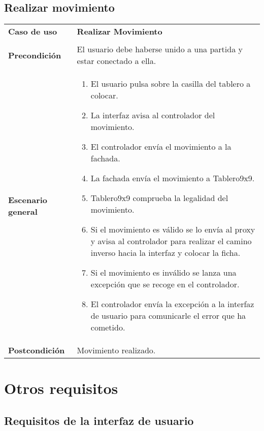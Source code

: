 \subsection{Realizar movimiento}

{\footnotesize
\begin{tabularx}{0.95\textwidth}{p{}|X}

\textbf{Caso de uso} & \textbf{Realizar Movimiento} \\
& \\
\textbf{Precondición} & El usuario debe haberse unido a una partida y estar
conectado a ella. \\

\textbf{Escenario general} & \begin{enumerate}
\item El usuario pulsa sobre la casilla del tablero a colocar.
\item La interfaz avisa al controlador del movimiento.
\item El controlador envía el movimiento a la fachada.
\item La fachada envía el movimiento a Tablero9x9.
\item Tablero9x9 comprueba la legalidad del movimiento.
\item Si el movimiento es válido se lo envía al proxy y avisa al controlador para realizar el camino inverso hacia la interfaz y colocar la ficha.
\item Si el movimiento es inválido se lanza una excepción que se recoge en el controlador.
\item El controlador envía la excepción a la interfaz de usuario para comunicarle el error que ha cometido.
\end{enumerate} \\
\textbf{Postcondición} & Movimiento realizado. \\
\end{tabularx}
}



\section{Otros requisitos}
\subsection{Requisitos de la interfaz de usuario}
